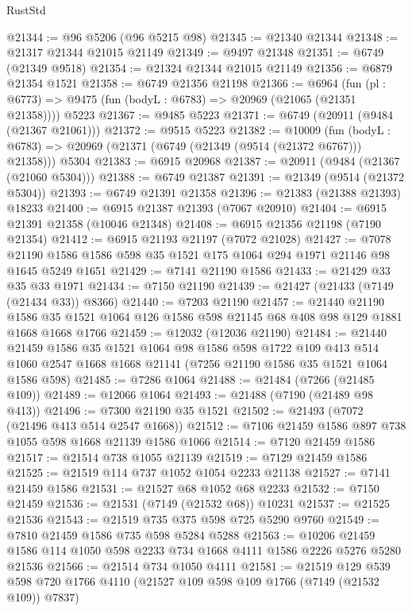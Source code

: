 \begin{lexlean}{RustStd}
\begin{coremodule}
@21344 := @96 @5206 (@96 @5215 @98)
@21345 := @21340 @21344
@21348 := @21317 @21344 @21015 @21149
@21349 := @9497 @21348
@21351 := @6749 (@21349 @9518)
@21354 := @21324 @21344 @21015 @21149
@21356 := @6879 @21354 @1521
@21358 := @6749 @21356 @21198
@21366 := @6964
    (fun (pl : @6773) => @9475 (fun (bodyL : @6783) => @20969 (@21065 (@21351 @21358))))
    @5223
@21367 := @9485 @5223
@21371 := @6749 (@20911 (@9484 (@21367 @21061)))
@21372 := @9515 @5223
@21382 := @10009
    (fun (bodyL : @6783) => @20969 (@21371 (@6749 (@21349 (@9514 (@21372 @6767))) @21358)))
    @5304
@21383 := @6915 @20968
@21387 := @20911 (@9484 (@21367 (@21060 @5304)))
@21388 := @6749 @21387
@21391 := @21349 (@9514 (@21372 @5304))
@21393 := @6749 @21391 @21358
@21396 := @21383 (@21388 @21393) @18233
@21400 := @6915 @21387 @21393 (@7067 @20910)
@21404 := @6915 @21391 @21358 (@10046 @21348)
@21408 := @6915 @21356 @21198 (@7190 @21354)
@21412 := @6915 @21193 @21197 (@7072 @21028)
@21427 := @7078 @21190 @1586 @1586 @598 @35 @1521 @175 @1064 @294 @1971 @21146 @98 @1645 @5249 @1651
@21429 := @7141 @21190 @1586
@21433 := @21429 @33 @35 @33 @1971
@21434 := @7150 @21190
@21439 := @21427 (@21433 (@7149 (@21434 @33)) @8366)
@21440 := @7203 @21190
@21457 := @21440
    @21190
    @1586
    @35
    @1521
    @1064
    @126
    @1586
    @598
    @21145
    @68
    @408
    @98
    @129
    @1881
    @1668
    @1668
    @1766
@21459 := @12032 (@12036 @21190)
@21484 := @21440
    @21459
    @1586
    @35
    @1521
    @1064
    @98
    @1586
    @598
    @1722
    @109
    @413
    @514
    @1060
    @2547
    @1668
    @1668
    @21141
    (@7256 @21190 @1586 @35 @1521 @1064 @1586 @598)
@21485 := @7286 @1064
@21488 := @21484 (@7266 (@21485 @109))
@21489 := @12066 @1064
@21493 := @21488 (@7190 (@21489 @98 @413))
@21496 := @7300 @21190 @35 @1521
@21502 := @21493 (@7072 (@21496 @413 @514 @2547 @1668))
@21512 := @7106 @21459 @1586 @897 @738 @1055 @598 @1668 @21139 @1586 @1066
@21514 := @7120 @21459 @1586
@21517 := @21514 @738 @1055 @21139
@21519 := @7129 @21459 @1586
@21525 := @21519 @114 @737 @1052 @1054 @2233 @21138
@21527 := @7141 @21459 @1586
@21531 := @21527 @68 @1052 @68 @2233
@21532 := @7150 @21459
@21536 := @21531 (@7149 (@21532 @68)) @10231
@21537 := @21525 @21536
@21543 := @21519 @735 @375 @598 @725 @5290 @9760
@21549 := @7810 @21459 @1586 @735 @598 @5284 @5288
@21563 := @10206 @21459 @1586 @114 @1050 @598 @2233 @734 @1668 @4111 @1586 @2226 @5276 @5280 @21536
@21566 := @21514 @734 @1050 @4111
@21581 := @21519
    @129
    @539
    @598
    @720
    @1766
    @4110
    (@21527 @109 @598 @109 @1766 (@7149 (@21532 @109)) @7837)

\end{coremodule}
\end{lexlean}
